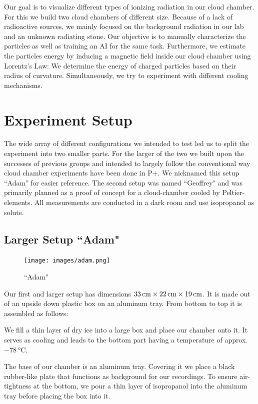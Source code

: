 \documentclass[10pt,a4paper]{article}
\begin{document}
Our goal is to visualize different types of ionizing radiation in our cloud chamber. For this we build two cloud chambers of different size. Because of a lack of radioactive sources, we mainly focused on the background radiation in our lab and an unknown radiating stone. Our objective is to manually characterize the particles as well as training an AI for the same task. Furthermore, we estimate the particles energy by inducing a magnetic field inside our cloud chamber using Lorentz's Law: We determine the energy of charged particles based on their radius of curvature. Simultaneously, we try to experiment with different cooling mechanisms.


\section{Experiment Setup}
The wide array of different configurations we intended to test led us to split the experiment into two smaller parts. For the larger of the two we built upon the successes of previous groups and intended to largely follow the conventional way cloud chamber experiments have been done in P+. We nicknamed this setup ``Adam" for easier reference.
The second setup was named ``Geoffrey" and was primarily planned as a proof of concept for a cloud-chamber cooled by Peltier-elements. All measurements are conducted in a dark room and use isopropanol as solute. 

\subsection{Larger Setup ``Adam"}
\begin{figure}
    \vspace{-\baselineskip}
    \texttt{[image: images/adam.png]}
    \caption{``Adam"}
    \label{fig:adam}
\end{figure}

Our first and larger setup has dimensions \( \qtyproduct{33x 22 x19}{\centi\meter}\). It is made out of an upside down plastic box on an aluminum tray. From bottom to top it is assembled as follows:

We fill a thin layer of dry ice into a large box and place our chamber onto it. It serves as cooling and leads to the bottom part having a temperature of approx. \(\qty{-78}{\celsius}\).

The base of our chamber is an aluminum tray. Covering it we place a black rubber-like plate that functions as background for our recordings. To ensure air-tightness at the bottom, we pour a thin layer of isopropanol into the aluminum tray before placing the box into it.
\end{document}
